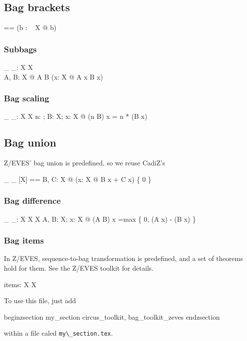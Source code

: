 \documentclass[draft,a4paper,10pt,wd]{article}
\begin{document}
\subsection*{Bag brackets}

\begin{zed}
\lbag \listarg \rbag [ X ]  == (\lambda b : \bag~ X @ b)
\end{zed}

\subsubsection*{Subbags}

\begin{gendef}[X]
  \_ \subbageq \_: \bag X \rel \bag X \\
\where
  \forall A, B: \bag X @ A \subbageq B \iff
	(\forall x: X @ A \bcount x \leq B \bcount x)
\end{gendef}

\subsubsection*{Bag scaling}

\begin{gendef}[X]
  \_ \otimes \_: \nat \cross \bag X \fun \bag X
\where
  \forall n: \nat; B: \bag X; x: X @
     (n \otimes B) \bcount x = n * (B \bcount x)
\end{gendef}

\subsection*{Bag union }

Z/EVES' bag union is predefined, so we reuse CadiZ's
\begin{zed}
\_ \uplus \_ [X] == \lambda B, C: \bag X @ (\lambda x: X @ B \bcount x + C \bcount x) \nrres \{ 0 \}
\end{zed}

\subsubsection*{Bag difference}

\begin{gendef}[X]
  \_ \uminus \_: \bag X \cross \bag X \fun \bag X
\where
  \forall A, B: \bag X; x: X @
     (A \uminus B) \bcount x =max \{ 0, (A \bcount x) - (B \bcount x) \}
\end{gendef}

\subsubsection*{Bag items}

In Z/EVES, sequence-to-bag transformation is predefined, and a set
of theorems hold for them. See the Z/EVES toolkit for details.
%
\begin{gendef}[X]
  items: \seq X \fun \bag X
\end{gendef}

To use this file, just add

begin{zsection}
\SECTION my\_section \parents circus\_toolkit, bag\_toolkit\_zeves
end{zsection}

within a file caled \verb'my\_section.tex'.
\end{document}
